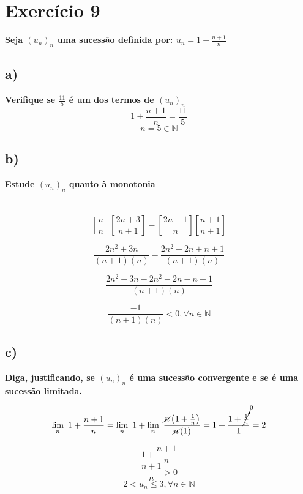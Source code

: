 \documentclass{article}
\begin{document}
\section*{Exercício 9} \textbf{Seja $\left(u_{n}\right)_{n}$ uma sucessão definida por: $u_{n}=1 + \frac{n+1}{n}$}
\subsection*{a)}
\textbf{Verifique se $\frac{11}{5}$ é um dos termos de $\left(u_{n}\right)_{n}$}
\[1 + \frac{n+1}{n}=\frac{11}{5}\]
\[n=5 \in \mathbb{N}\]

\subsection*{b)}
\textbf{Estude $\left(u_{n}\right)_{n}$ quanto à monotonia}\\
\\
\\
\[\left[\frac{n}{n}\right]\left[\frac{2n+3}{n+1}\right] - \left[\frac{2n+1}{n}\right]\left[\frac{n+1}{n+1}\right] \]

\[\frac{2n^2+3n}{\left(n+1\right)\left(n\right)} - \frac{2n^2+2n+n+1}{\left(n+1\right)\left(n\right)}\]

\[\frac{2n^2+3n-2n^2-2n-n-1}{\left(n+1\right)\left(n\right)}\]

\[\frac{-1}{\left(n+1\right)\left(n\right)}<0, \forall n \in \mathbb{N}\]


\subsection*{c)}
\textbf{Diga, justificando, se $\left(u_{n}\right)_{n}$ é uma sucessão convergente e se é uma sucessão limitada.}

\[\lim\limits_{n}\ 1 + \frac{n+1}{n} =
\lim\limits_{n} \ 1 + \lim\limits_{n} \ \frac{\cancel{n}\left(1+\frac{1}{n}\right)}{\cancel{n}\left(1\right)} = 1+\frac{1+ \cancelto{0}{\frac{1}{n}}}{1} = 2\]


\[1 + \frac{n+1}{n}\]
\[\frac{n+1}{n} > 0\]
\[2 < u_{n} \leq 3, \forall n \in \mathbb{N} \]
\end{document}
